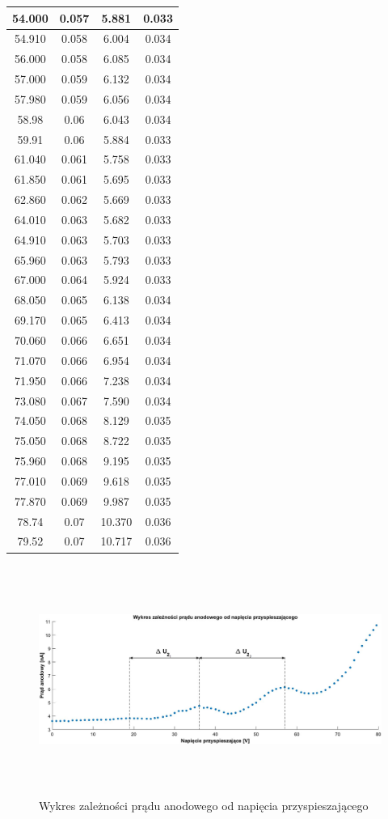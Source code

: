 \documentclass[12pt, a4paper, oneside]{article}
\begin{document}
\begin{longtable}{|c|c|c|c|}
    54.000 & 0.057 & 5.881 & 0.033 \\\hline
    54.910 & 0.058 & 6.004 & 0.034 \\\hline
    56.000 & 0.058 & 6.085 & 0.034 \\\hline
    57.000 & 0.059 & 6.132 & 0.034 \\\hline
    57.980 & 0.059 & 6.056 & 0.034 \\\hline
    58.98 & 0.06 & 6.043 & 0.034 \\\hline
    59.91 & 0.06 & 5.884 & 0.033 \\\hline
    61.040 & 0.061 & 5.758 & 0.033 \\\hline
    61.850 & 0.061 & 5.695 & 0.033 \\\hline
    62.860 & 0.062 & 5.669 & 0.033 \\\hline
    64.010 & 0.063 & 5.682 & 0.033 \\\hline
    64.910 & 0.063 & 5.703 & 0.033 \\\hline
    65.960 & 0.063 & 5.793 & 0.033 \\\hline
    67.000 & 0.064 & 5.924 & 0.033 \\\hline
    68.050 & 0.065 & 6.138 & 0.034 \\\hline
    69.170 & 0.065 & 6.413 & 0.034 \\\hline
    70.060 & 0.066 & 6.651 & 0.034 \\\hline
    71.070 & 0.066 & 6.954 & 0.034 \\\hline
    71.950 & 0.066 & 7.238 & 0.034 \\\hline
    73.080 & 0.067 & 7.590 & 0.034 \\\hline
    74.050 & 0.068 & 8.129 & 0.035 \\\hline
    75.050 & 0.068 & 8.722 & 0.035 \\\hline
    75.960 & 0.068 & 9.195 & 0.035 \\\hline
    77.010 & 0.069 & 9.618 & 0.035 \\\hline
    77.870 & 0.069 & 9.987 & 0.035 \\\hline
    78.74 & 0.07 & 10.370 & 0.036 \\\hline
    79.52 & 0.07 & 10.717 & 0.036 \\\hline
\end{longtable}%
\clearpage
\begin{figure}[h]
\centering
\caption{Wykres zależności prądu anodowego od napięcia przyspieszającego}
\includegraphics[width=17.5cm,height=7.5cm]{chart1.png}
\end{figure}
\end{document}
